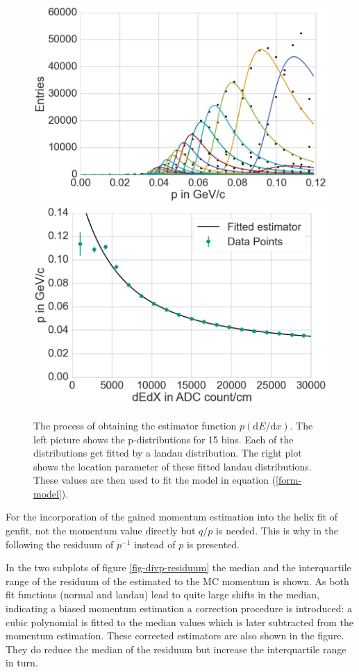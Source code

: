 \begin{figure}
  \centering
  \includegraphics[width=0.48\linewidth]{figures/vxd/fitLandau1.png}
  \includegraphics[width=0.48\linewidth]{figures/vxd/fitLandau2.png}
  \caption[The process of obtaining the estimator function $p(\mathrm d E/\mathrm d x)$.]{The process of obtaining the estimator function $p(\mathrm d E/\mathrm d x)$. The left picture shows the p-distributions for 15 \dedx bins. Each of the distributions get fitted by a landau distribution. The right plot shows the location parameter of these fitted landau distributions. These values are then used to fit the model in equation (\ref{form-model}).}
  \label{fig-fit-bins}
\end{figure}

For the incorporation of the gained momentum estimation into the helix fit of genfit, not the momentum value directly but $q/p$ is needed. This is why in the following the residuum of $p^{-1}$ instead of $p$ is presented.

In the two subplots of figure \ref{fig-divp-residuum} the median and the interquartile range of the residuum of the estimated to the MC momentum is shown. As both fit functions (normal and landau) lead to quite large shifts in the median, indicating a biased momentum estimation a correction procedure is introduced: a cubic polynomial is fitted to the median values which is later subtracted from the momentum estimation. These corrected estimators are also shown in the figure. They do reduce the median of the residuum but increase the interquartile range in turn.

